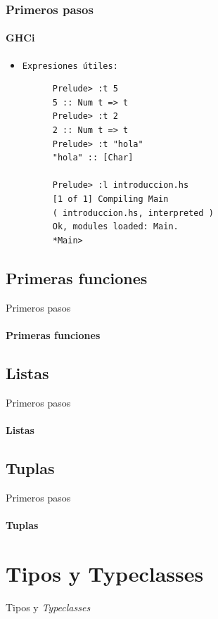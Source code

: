 \documentclass{beamer}
\begin{document}
\begin{frame}[fragile]
  \frametitle{Primeros pasos}
  \framesubtitle{GHCi}
  \begin{itemize}
  \item\texttt{Expresiones útiles:}
    \begin{verbatim}
      Prelude> :t 5
      5 :: Num t => t
      Prelude> :t 2
      2 :: Num t => t
      Prelude> :t "hola"
      "hola" :: [Char]

      Prelude> :l introduccion.hs
      [1 of 1] Compiling Main
      ( introduccion.hs, interpreted )
      Ok, modules loaded: Main.
      *Main>
    \end{verbatim}
  \end{itemize}
\end{frame}

\subsection{Primeras funciones}
\begin{frame}{Primeros pasos}      %
  \framesubtitle{Primeras funciones}

\end{frame}

\subsection{Listas}
\begin{frame}{Primeros pasos}      %
  \framesubtitle{Listas}

\end{frame}

\subsection{Tuplas}
\begin{frame}{Primeros pasos}      %
  \framesubtitle{Tuplas}

\end{frame}

\section{Tipos y Typeclasses}
\begin{frame}{Tipos y \emph{Typeclasses}}      %

\end{frame}
\end{document}
